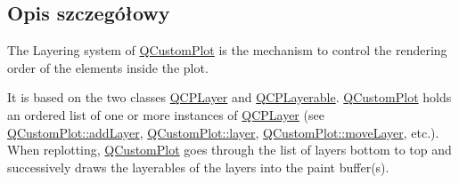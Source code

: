 \subsection{Opis szczegółowy}
The Layering system of \hyperlink{class_q_custom_plot}{Q\+Custom\+Plot} is the mechanism to control the rendering order of the elements inside the plot.

It is based on the two classes \hyperlink{class_q_c_p_layer}{Q\+C\+P\+Layer} and \hyperlink{class_q_c_p_layerable}{Q\+C\+P\+Layerable}. \hyperlink{class_q_custom_plot}{Q\+Custom\+Plot} holds an ordered list of one or more instances of \hyperlink{class_q_c_p_layer}{Q\+C\+P\+Layer} (see \hyperlink{class_q_custom_plot_ad5255393df078448bb6ac83fa5db5f52}{Q\+Custom\+Plot\+::add\+Layer}, \hyperlink{class_q_custom_plot_aac492da01782820454e9136a8db28182}{Q\+Custom\+Plot\+::layer}, \hyperlink{class_q_custom_plot_ae896140beff19424e9e9e02d6e331104}{Q\+Custom\+Plot\+::move\+Layer}, etc.). When replotting, \hyperlink{class_q_custom_plot}{Q\+Custom\+Plot} goes through the list of layers bottom to top and successively draws the layerables of the layers into the paint buffer(s).

